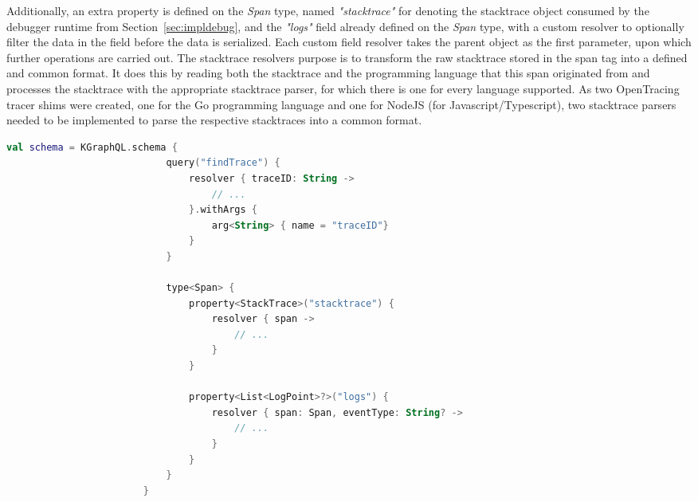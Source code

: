 \documentclass[12pt,pdftex,titlepage]{report}
\begin{document}
                Additionally, an extra property is defined on the \textit{Span} type, named \textit{"stacktrace"} for denoting the stacktrace object consumed by the debugger runtime from Section~\ref{sec:impldebug}, 
                and the \textit{"logs"} field already defined on the \textit{Span} type, with a custom resolver to optionally filter the data in the field before the data is serialized. Each custom field resolver takes
                the parent object as the first parameter, upon which further operations are carried out. The stacktrace resolvers purpose is to transform the raw stacktrace stored in the span tag into a defined and common
                format. It does this by reading both the stacktrace and the programming language that this span originated from and processes the stacktrace with the appropriate stacktrace parser, for which there is one
                for every language supported. As two OpenTracing tracer shims were created, one for the Go programming language and one for NodeJS (for Javascript/Typescript), two stacktrace parsers needed to be implemented 
                to parse the respective stacktraces into a common format.

                \begin{spacing}{1.0}
                    \begin{lstlisting}[caption=Kotlin snippet of defining the GraphQL schema using the Kotlin DSL., language=Kotlin, gobble=24, label={lst:kgraphql}]
                        val schema = KGraphQL.schema { 
                            query("findTrace") { 
                                resolver { traceID: String ->
                                    // ...
                                }.withArgs { 
                                    arg<String> { name = "traceID"}
                                }
                            }

                            type<Span> {
                                property<StackTrace>("stacktrace") { 
                                    resolver { span ->
                                        // ...
                                    }
                                }

                                property<List<LogPoint>?>("logs") {
                                    resolver { span: Span, eventType: String? ->
                                        // ...
                                    }
                                }
                            }
                        }                
                    \end{lstlisting}
                \end{spacing}
\end{document}
